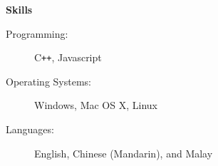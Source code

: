 \documentclass[letterpaper,11pt]{article}
\newcommand{\resheading}[1]{{\begin{mdframed}[backgroundcolor=mygray]{\large \textbf{#1}}\end{mdframed}}}
\begin{document}

\resheading{Skills}

\begin{description}
\item[Programming:]
C{}\verb!++!, Javascript
\item[Operating Systems:]
Windows, Mac OS X, Linux
\item[Languages:]
English, Chinese (Mandarin), and Malay
\end{description}
\end{document}
